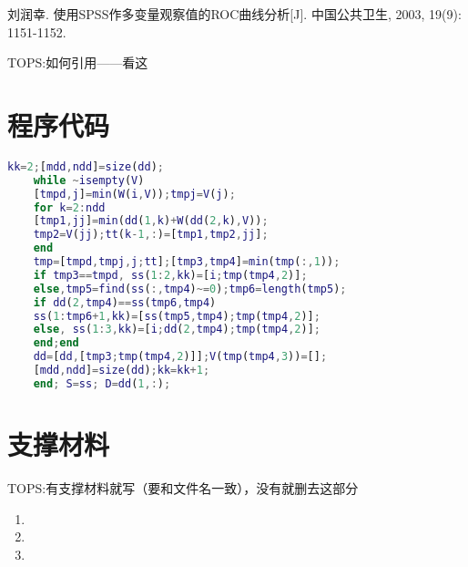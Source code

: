 \documentclass[withoutpreface,bwprint]{cumcmthesis} %
\begin{document}
\newpage
\begin{thebibliography}{9}%
	
	\setlength{\itemsep}{-1mm}
     刘润幸. 使用SPSS作多变量观察值的ROC曲线分析[J]. 中国公共卫生, 2003, 19(9): 1151-1152.
    

TOPS:如何引用——看这\textsuperscript{\cite{bib:one}}

\end{thebibliography}	
\newpage
\appendix
	
\section{程序代码}
\begin{lstlisting}[language=matlab]
	kk=2;[mdd,ndd]=size(dd);
	while ~isempty(V)
	[tmpd,j]=min(W(i,V));tmpj=V(j);
	for k=2:ndd
	[tmp1,jj]=min(dd(1,k)+W(dd(2,k),V));
	tmp2=V(jj);tt(k-1,:)=[tmp1,tmp2,jj];
	end
	tmp=[tmpd,tmpj,j;tt];[tmp3,tmp4]=min(tmp(:,1));
	if tmp3==tmpd, ss(1:2,kk)=[i;tmp(tmp4,2)];
	else,tmp5=find(ss(:,tmp4)~=0);tmp6=length(tmp5);
	if dd(2,tmp4)==ss(tmp6,tmp4)
	ss(1:tmp6+1,kk)=[ss(tmp5,tmp4);tmp(tmp4,2)];
	else, ss(1:3,kk)=[i;dd(2,tmp4);tmp(tmp4,2)];
	end;end
	dd=[dd,[tmp3;tmp(tmp4,2)]];V(tmp(tmp4,3))=[];
	[mdd,ndd]=size(dd);kk=kk+1;
	end; S=ss; D=dd(1,:);
\end{lstlisting}

\section{支撑材料}

TOPS:有支撑材料就写（要和文件名一致），没有就删去这部分

\begin{enumerate}
	\item 	
	
	\item 
	
	\item 
\end{enumerate}
\end{document}
